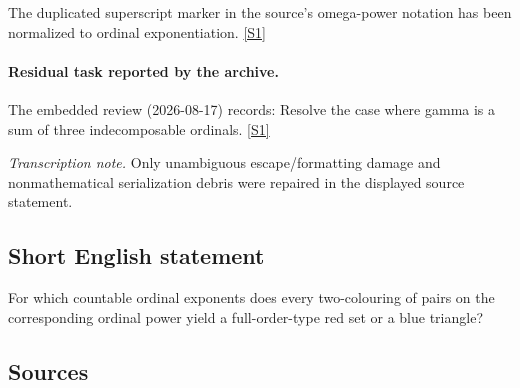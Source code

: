 \documentclass[11pt,a4paper]{article}
\newcommand{\sref}[2]{\hyperlink{source:#1:#2}{[S#2]}}
\begin{document}
The duplicated superscript marker in the source’s omega-power notation has been normalized to ordinal exponentiation. \sref{statement}{1}

\paragraph{Residual task reported by the archive.}

The embedded review (2026-08-17) records: Resolve the case where gamma is a sum of three indecomposable ordinals. \sref{statement}{1}

{\small\emph{Transcription note.} Only unambiguous escape/formatting damage and nonmathematical serialization debris were repaired in the displayed source statement.}

\subsection{Short English statement}

For which countable ordinal exponents does every two-colouring of pairs on the corresponding ordinal power yield a full-order-type red set or a blue triangle?

\subsection{Sources}
\end{document}
